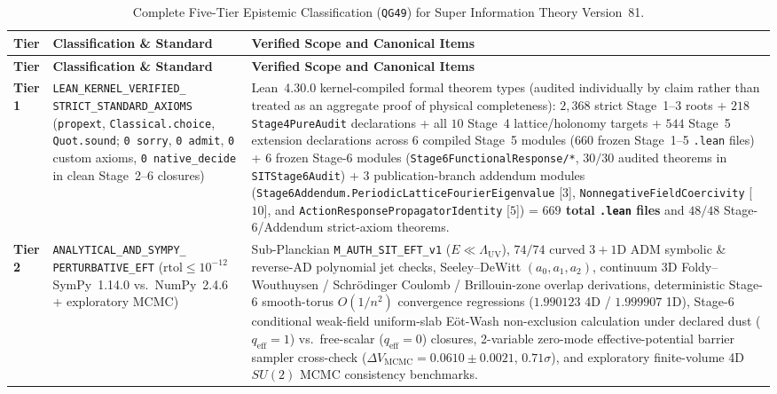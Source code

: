 \begin{longtable}{|p{2.3cm}|p{4.3cm}|p{8.4cm}|}
\caption{Complete Five-Tier Epistemic Classification (\texttt{QG49}) for Super Information Theory Version~81.}\label{tab:qg49-ledger}\\
\hline
\textbf{Tier} & \textbf{Classification \& Standard} & \textbf{Verified Scope and Canonical Items} \\
\hline
\endfirsthead
\hline
\textbf{Tier} & \textbf{Classification \& Standard} & \textbf{Verified Scope and Canonical Items} \\
\hline
\endhead
\hline
\endfoot
\textbf{Tier 1} & \texttt{LEAN\_\allowbreak{}KERNEL\_\allowbreak{}VERIFIED\_\allowbreak{}} \texttt{STRICT\_\allowbreak{}STANDARD\_\allowbreak{}AXIOMS} (\texttt{propext}, \texttt{Classical.choice}, \texttt{Quot.sound}; \texttt{0 sorry}, \texttt{0 admit}, \texttt{0} custom axioms, \texttt{0 native\_decide} in clean Stage~2--6 closures) & Lean~4.30.0 kernel-compiled formal theorem types (audited individually by claim rather than treated as an aggregate proof of physical completeness): $2{,}368$ strict Stage~1--3 roots + $218$ \texttt{Stage4PureAudit} declarations + all $10$ Stage~4 lattice/holonomy targets + $544$ Stage~5 extension declarations across $6$ compiled Stage~5 modules ($660$ frozen Stage~1--5 \texttt{.lean} files) + $6$ frozen Stage-6 modules (\texttt{Stage6FunctionalResponse/*}, $30/30$ audited theorems in \texttt{SITStage6Audit}) + $3$ publication-branch addendum modules (\texttt{Stage6Addendum.\allowbreak{}PeriodicLatticeFourierEigenvalue} [$3$], \texttt{NonnegativeFieldCoercivity} [$10$], and \texttt{ActionResponsePropagatorIdentity} [$5$]) = \textbf{$669$ total \texttt{.lean} files} and $48/48$ Stage-6/Addendum strict-axiom theorems. \\
\hline
\textbf{Tier 2} & \texttt{ANALYTICAL\_\allowbreak{}AND\_\allowbreak{}SYMPY\_\allowbreak{}} \texttt{PERTURBATIVE\_EFT} ($\mathrm{rtol} \le 10^{-12}$ SymPy~1.14.0 vs.\ NumPy~2.4.6 + exploratory MCMC) & Sub-Planckian \texttt{M\_AUTH\_SIT\_EFT\_v1} ($E \ll \Lambda_{\mathrm{UV}}$), $74/74$ curved $3+1$D ADM symbolic \& reverse-AD polynomial jet checks, Seeley--DeWitt $(a_0,a_1,a_2)$, continuum 3D Foldy--Wouthuysen / Schr\"odinger Coulomb / Brillouin-zone overlap derivations, deterministic Stage-6 smooth-torus $O(1/n^2)$ convergence regressions ($1.990123$ 4D / $1.999907$ 1D), Stage-6 conditional weak-field uniform-slab E\"ot-Wash non-exclusion calculation under declared dust ($q_{\mathrm{eff}}=1$) vs.\ free-scalar ($q_{\mathrm{eff}}=0$) closures, 2-variable zero-mode effective-potential barrier sampler cross-check ($\Delta V_{\mathrm{MCMC}} = 0.0610 \pm 0.0021$, $0.71\sigma$), and exploratory finite-volume 4D $SU(2)$ MCMC consistency benchmarks. \\

\end{longtable}
